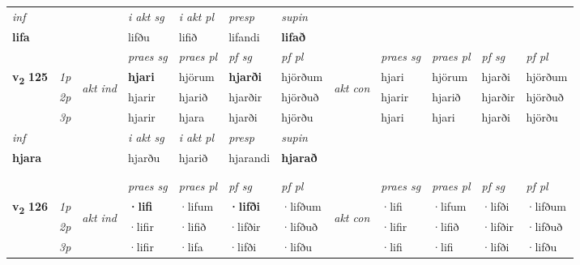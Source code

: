 \begin{longtable}[l]{X>{\footnotesize\itshape}llXXXXlXXXX}
   {\textit{inf}} & &  & \textit{i akt sg} & \textit{i akt pl}   & \textit{presp} & \textit{supin}   \\*
  {\textbf{lifa}} & && lifðu  & lifið   & lifandi &  \textbf{lifað}   \\*

\midrule

 & &   & \textit{praes sg}  & \textit{praes pl}    & \textit{ pf sg} & \textit{pf pl} & & \textit{praes sg}  & \textit{praes pl}    & \textit{pf sg} & \textit{pf pl }  \\ \cmidrule{4-7} \cmidrule{9-12}
 \multirow{2}{*}{{{\textbf{v{\textsubscript{2}}} \Large{\textbf{125}}}}}  & 1p & \multirow{3}{*}{\begin{turn}{90}\textit{akt ind}\end{turn}} & \textbf{hjari} & hjörum & \textbf{hjarði} & hjörðum & \multirow{3}{*}{\begin{turn}{90}\textit{akt con}\end{turn}} &hjari & hjörum & hjarði & hjörðum\\*
 & 2p &  &  hjarir  & hjarið & hjarðir & hjörðuð & & hjarir & hjarið & hjarðir & hjörðuð \\*
 & 3p &  & hjarir & hjara & hjarði & hjörðu & & hjari & hjari& hjarði & hjörðu \\*
\cmidrule{4-7} \cmidrule{9-12}

   {\textit{inf}} & &  & \textit{i akt sg} & \textit{i akt pl}   & \textit{presp} & \textit{supin}   \\*
  {\textbf{hjara}} & && hjarðu  & hjarið   & hjarandi &  \textbf{hjarað}   \\*

\midrule


   & \\*
  & \\
   \midrule
 & &   & \textit{praes sg}  & \textit{praes pl}    & \textit{ pf sg} & \textit{pf pl} & & \textit{praes sg}  & \textit{praes pl}    & \textit{pf sg} & \textit{pf pl }  \\ \cmidrule{4-7} \cmidrule{9-12}
 \multirow{2}{*}{{{\textbf{v{\textsubscript{2}}} \Large{\textbf{126}}}}}  & 1p & \multirow{3}{*}{\begin{turn}{90}\textit{akt ind}\end{turn}} & \textbf{·lifi} & ·lifum & \textbf{·lifði} & ·lifðum & \multirow{3}{*}{\begin{turn}{90}\textit{akt con}\end{turn}} &·lifi & ·lifum & ·lifði & ·lifðum\\*
 & 2p &  &  ·lifir  & ·lifið & ·lifðir & ·lifðuð & & ·lifir & ·lifið & ·lifðir & ·lifðuð \\*
 & 3p &  & ·lifir & ·lifa & ·lifði & ·lifðu & & ·lifi & ·lifi& ·lifði & ·lifðu \\*
\cmidrule{4-7} \cmidrule{9-12}


\end{longtable}
